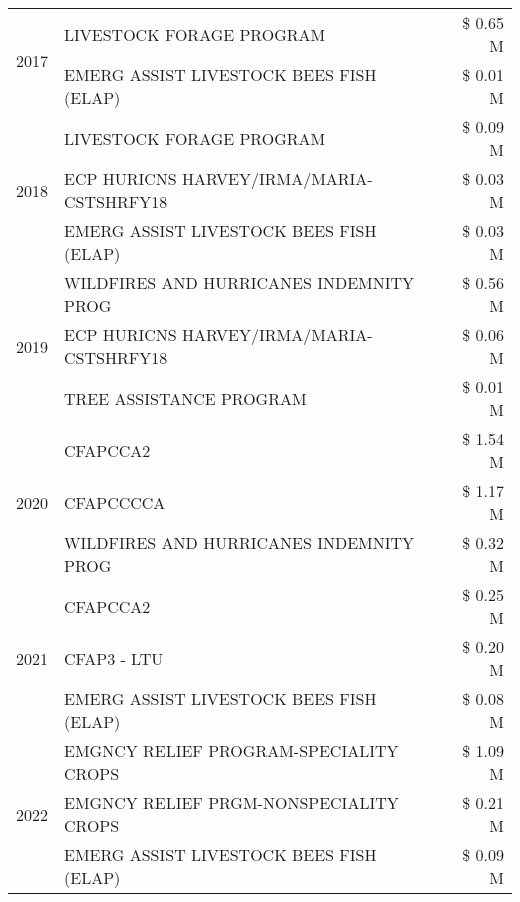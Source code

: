 \begin{tabular}{llr}
\multirow[t]{2}{*}{2017} & LIVESTOCK FORAGE PROGRAM & \$ 0.65 M \\
 & EMERG ASSIST LIVESTOCK BEES FISH (ELAP) & \$ 0.01 M \\
\cline{1-3}
\multirow[t]{3}{*}{2018} & LIVESTOCK FORAGE PROGRAM & \$ 0.09 M \\
 & ECP HURICNS HARVEY/IRMA/MARIA-CSTSHRFY18 & \$ 0.03 M \\
 & EMERG ASSIST LIVESTOCK BEES FISH (ELAP) & \$ 0.03 M \\
\cline{1-3}
\multirow[t]{3}{*}{2019} & WILDFIRES AND HURRICANES INDEMNITY PROG & \$ 0.56 M \\
 & ECP HURICNS HARVEY/IRMA/MARIA-CSTSHRFY18 & \$ 0.06 M \\
 & TREE ASSISTANCE PROGRAM & \$ 0.01 M \\
\cline{1-3}
\multirow[t]{3}{*}{2020} & CFAPCCA2 & \$ 1.54 M \\
 & CFAPCCCCA & \$ 1.17 M \\
 & WILDFIRES AND HURRICANES INDEMNITY PROG & \$ 0.32 M \\
\cline{1-3}
\multirow[t]{3}{*}{2021} & CFAPCCA2 & \$ 0.25 M \\
 & CFAP3 - LTU & \$ 0.20 M \\
 & EMERG ASSIST LIVESTOCK BEES FISH (ELAP) & \$ 0.08 M \\
\cline{1-3}
\multirow[t]{3}{*}{2022} & EMGNCY RELIEF PROGRAM-SPECIALITY CROPS & \$ 1.09 M \\
 & EMGNCY RELIEF PRGM-NONSPECIALITY CROPS & \$ 0.21 M \\
 & EMERG ASSIST LIVESTOCK BEES FISH (ELAP) & \$ 0.09 M \\
\cline{1-3}
\bottomrule
\end{tabular}
